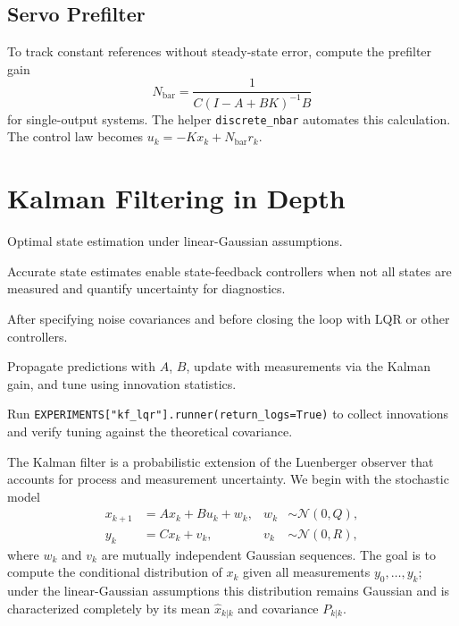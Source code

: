 \subsection{Servo Prefilter}
To track constant references without steady-state error, compute the prefilter gain
\begin{equation}
    N_{\text{bar}} = \frac{1}{C (I - A + B K)^{-1} B}
\end{equation}
for single-output systems. The helper \texttt{discrete\_nbar} automates this calculation. The control law becomes $u_k = -K x_k + N_{\text{bar}} r_k$.

\section{Kalman Filtering in Depth}
\begin{beginnerguide}
    \item[\textbf{What?}] Optimal state estimation under linear-Gaussian assumptions.
    \item[\textbf{Why?}] Accurate state estimates enable state-feedback controllers when not all states are measured and quantify uncertainty for diagnostics.
    \item[\textbf{When?}] After specifying noise covariances and before closing the loop with LQR or other controllers.
    \item[\textbf{How?}] Propagate predictions with $A$, $B$, update with measurements via the Kalman gain, and tune using innovation statistics.
    \item[\textbf{Example}] Run \texttt{EXPERIMENTS["kf\_lqr"].runner(return\_logs=True)} to collect innovations and verify tuning against the theoretical covariance.
\end{beginnerguide}
The Kalman filter is a probabilistic extension of the Luenberger observer that accounts for process and measurement uncertainty. We begin with the stochastic model
\begin{align}
    x_{k+1} &= A x_k + B u_k + w_k, & w_k &\sim \mathcal{N}(0, Q), \label{eq:kalman-process}\\
    y_k &= C x_k + v_k, & v_k &\sim \mathcal{N}(0, R), \label{eq:kalman-measure}
\end{align}
where $w_k$ and $v_k$ are mutually independent Gaussian sequences. The goal is to compute the conditional distribution of $x_k$ given all measurements $y_0,\dots,y_k$; under the linear-Gaussian assumptions this distribution remains Gaussian and is characterized completely by its mean $\hat{x}_{k|k}$ and covariance $P_{k|k}$.

